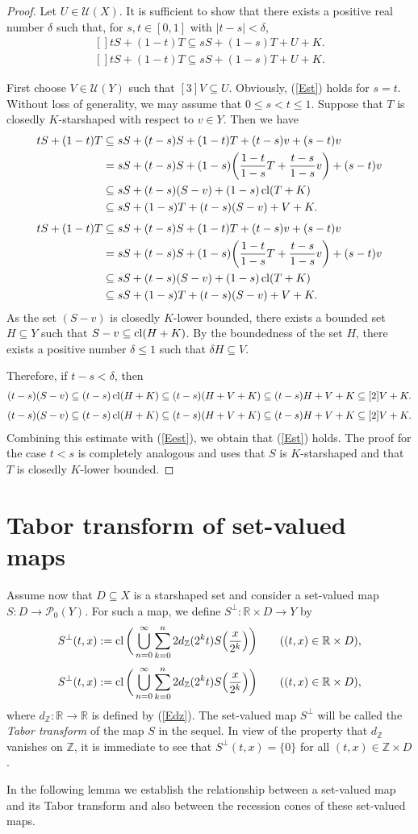 \documentclass[12pt,reqno]{amsart}
\newcommand{\R}{\mathbb{R}}
\newcommand{\Z}{\mathbb{Z}}
\renewcommand{\P}{\mathscr{P}}
\newcommand{\U}{\mathscr{U}}
\newcommand{\cl}{\mathop{\hbox{\rm cl}}\nolimits}
\theoremstyle{definition}
\def\eq#1{{\rm(\ref{E#1})}}
\def\Eq#1#2{\ifthenelse{\equal{#1}{*}}
  {\begin{equation*}\begin{aligned}[]#2\end{aligned}\end{equation*}}
  {\begin{equation}\begin{aligned}[]\label{E#1}#2\end{aligned}\end{equation}}}
\begin{document}
\begin{proof}
Let $U\in\U(X)$. It is sufficient to show that there exists a positive real number $\delta$ such that, for 
$s,t\in[0,1]$ with $|t-s|<\delta$, 
\Eq{st}{
  tS+(1-t)T\subseteq sS+(1-s)T + U+K.
}

First choose $V\in\U(Y)$ such that $[3]V\subseteq U$. Obviously, \eq{st} holds for $s=t$. Without loss of generality, 
we may assume that $0\leq s<t\leq 1$. Suppose that $T$ is closedly $K$-starshaped with respect to $v\in Y$. Then we have
\Eq{est}{
tS+(1-t)T
&\subseteq sS + (t-s)S + (1-t)T + (t-s)v+(s-t)v \\
&= sS + (t-s)S + (1-s)\bigg(\frac{1-t}{1-s}T+ \frac{t-s}{1-s}v\bigg)+(s-t)v \\
&\subseteq sS + (t-s)(S-v) + (1-s)\cl(T+K) \\
&\subseteq sS + (1-s)T + (t-s)(S-v) +V+K.
}
As the set $(S-v)$ is closedly $K$-lower bounded, there exists a bounded set 
$H\subseteq Y$ such that $S-v\subseteq\cl(H+K)$. By the boundedness of the set $H$, there exists
a positive number $\delta\leq 1$ such that $\delta H\subseteq V$. 

Therefore, if $t-s<\delta$, then
\Eq{*}{
  (t-s)(S-v)\subseteq (t-s)\cl(H+K)\subseteq (t-s)(H+V+K) \subseteq (t-s)H+V+K \subseteq [2]V+K.
}
Combining this estimate with \eq{est}, we obtain that \eq{st} holds. The proof for the case
$t<s$ is completely analogous and uses that $S$ is $K$-starshaped and that $T$ is closedly $K$-lower bounded.
\end{proof}


\section{Tabor transform of set-valued maps}
\setcounter{theorem}{0}

Assume now that $D\subseteq X$ is a starshaped set and consider a set-valued map $S:D\to\P_0(Y)$.
For such a map, we define $S^\perp:\R\times D\to Y$ by
\Eq{Tab0}{
  S^\perp(t,x):=\cl\bigg(\bigcup_{n=0}^{\infty} \sum_{k=0}^{n}
                 2d_{\Z}(2^kt)S\Big(\frac{x}{2^k}\Big)\bigg)\qquad((t,x)\in\R\times D),
}
where $d_{\Z}:\R\to\R$ is defined by \eq{dz}.
The set-valued map $S^\perp$ will be called the \textit{Tabor transform} of the map $S$ in the sequel.
In view of the property that $d_\Z$ vanishes on $\Z$, it is immediate to see that $S^\perp(t,x)=\{0\}$ for all 
$(t,x)\in\Z\times D$.

In the following lemma we establish the relationship between a set-valued map and its Tabor transform
and also between the recession cones of these set-valued maps.
\end{document}
